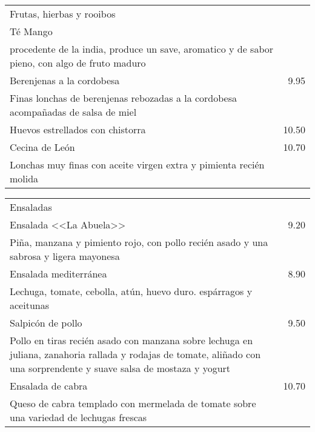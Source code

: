 \documentclass[12pt]{article}
\makeatletter
\newcommand*\ColText[1]{\textcolor{Goldenrod3}{#1}}
\newenvironment{Group}[1]
{\noindent\begin{tabular*}{\textwidth}{@{}p{.8\linewidth}@{\extracolsep{\fill}}r@{}}
{\fontsize{24}{29}\selectfont\ColText{#1}}
              \\[0.8em]}
              {
\end{tabular*}}
\newcommand*\Entry[2]{%
    \sffamily#1 & #2}
\newcommand*\Expl[1]{%
    \hspace*{1em}\footnotesize #1}
\makeatother
\begin{document}
    \begin{Group}{Frutas, hierbas y rooibos}
        \Entry{Té Mango}{}                                                         \\
        \Expl{procedente de la india, produce un save, aromatico y de sabor pieno, con algo de fruto maduro}                      \\
        \Entry{Berenjenas a la cordobesa}{9.95}                                                  \\
        \Expl{Finas lonchas de berenjenas rebozadas a la cordobesa acompañadas de salsa de miel} \\
        \Entry{Huevos estrellados con chistorra}{10.50}                                          \\
        \Entry{Cecina de León}{10.70}                                                            \\
        \Expl{Lonchas muy finas con aceite virgen extra y pimienta recién molida}                \\
    \end{Group}

    \vfill

    \begin{Group}{Ensaladas}
        \Entry{Ensalada <<La Abuela>>}{9.20}                                                                                                                                           \\
        \Expl{Piña, manzana y pimiento rojo, con pollo recién asado y una sabrosa y ligera mayonesa} \\
        \Entry{Ensalada mediterránea}{8.90}                                                                                                                                            \\
        \Expl{Lechuga, tomate, cebolla, atún, huevo duro. espárragos y aceitunas}                                                                                                      \\
        \Entry{Salpicón de pollo}{9.50}                                                                                                                                                \\
        \Expl{Pollo en tiras recién asado con manzana sobre lechuga en juliana, zanahoria rallada y rodajas de tomate, aliñado con una sorprendente y suave salsa de mostaza y yogurt} \\
        \Entry{Ensalada de cabra}{10.70}                                                                                                                                               \\
        \Expl{Queso de cabra templado con mermelada de tomate sobre una variedad de lechugas frescas} \\
    \end{Group}
\end{document}
